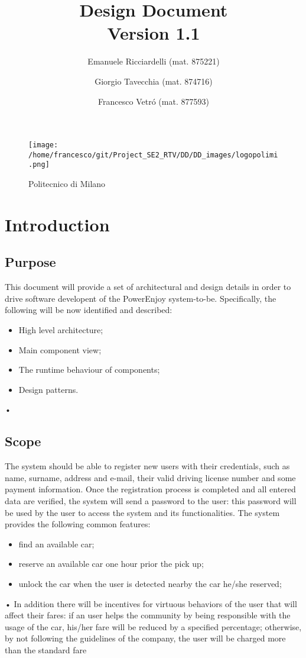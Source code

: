 \documentclass[10pt, a4paper,titlepage]{article}
\begin{document}
\begin{titlepage}
\title{Design Document \\Version 1.1}
\author{Emanuele Ricciardelli (mat. 875221) \and Giorgio Tavecchia (mat. 874716) \and Francesco Vetr\'o (mat. 877593)}
\begin{figure}
\begin{center}
\texttt{[image: /home/francesco/git/Project\_SE2\_RTV/DD/DD\_images/logopolimi.png]}
\caption{Politecnico di Milano}
\label{fig:logo}
\end{center}
\end{figure}
\maketitle
\end{titlepage}
\tableofcontents
\pagebreak
\section{Introduction}
\subsection{Purpose}
This document will provide a set of architectural and design details in order to drive software developent of the PowerEnjoy system-to-be. Specifically,  the following will be now identified and described:
\begin{itemize}
\item High level architecture;
\item Main component view;
\item The runtime behaviour of components;
\item Design patterns.
\end{itemize}•
\subsection{Scope}
The system should be able to register new users with their credentials, such as name, surname, address and e-mail, their valid driving license number and some payment information. Once the registration process is completed and all entered data are veriﬁed, the system will send a password to the user: this password will be used by the user to access the system and its functionalities. The system provides the following common features: 
\begin{itemize}
\item find an available car;
\item reserve an available car one hour prior the pick up; 
\item unlock the car when the user is detected nearby the car he/she reserved;
\end{itemize}•
In addition there will be incentives for virtuous behaviors of the user that will aﬀect their fares: if an user helps the community by being responsible with the usage of the car, his/her fare will be reduced by a speciﬁed percentage; otherwise, by not following the guidelines of the company, the user will be charged more than the standard fare
\end{document}
